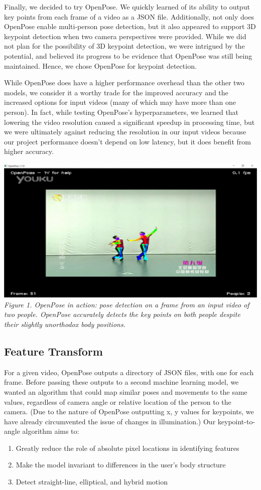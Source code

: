 \indent Finally, we decided to try OpenPose. We quickly learned of its ability to output key points from each frame of a 
video as a JSON file. Additionally, not only does OpenPose enable multi-person pose detection, but it also appeared 
to support 3D keypoint detection when two camera perspectives were provided. While we did not plan for the possibility 
of 3D keypoint detection, we were intrigued by the potential, and believed its progress to be evidence that OpenPose 
was still being maintained. Hence, we chose OpenPose for keypoint detection.
	
\indent While OpenPose does have a higher performance overhead than the other two models, we consider it a worthy trade for the 
improved accuracy and the increased options for input videos (many of which may have more than one person). In fact, while 
testing OpenPose’s hyperparameters, we learned that lowering the video resolution caused a significant speedup in 
processing time, but we were ultimately against reducing the resolution in our input videos because our project 
performance doesn’t depend on low latency, but it does benefit from higher accuracy.

\includegraphics[width=\columnwidth]{sec/openpose_demo}
\textit{Figure 1. OpenPose in action: pose detection on a frame from an input video of two people. 
OpenPose accurately detects the key points on both people despite their slightly unorthodox body positions.}

\subsection{Feature Transform}
\indent For a given video, OpenPose outputs a directory of JSON files, with one for each frame. Before passing these outputs to a 
second machine learning model, we wanted an algorithm that could map similar poses and movements to the same values, 
regardless of camera angle or relative location of the person to the camera. (Due to the nature of OpenPose outputting x, 
y values for keypoints, we have already circumvented the issue of changes in illumination.)  Our keypoint-to-angle algorithm 
aims to:
\begin{enumerate}
    \item Greatly reduce the role of absolute pixel locations in identifying features
    \item Make the model invariant to differences in the user’s body structure
    \item Detect straight-line, elliptical, and hybrid motion
\end{enumerate}

